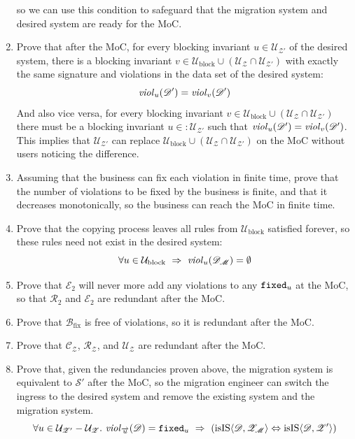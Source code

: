 \documentclass[runningheads]{llncs}
\newcommand{\id}[1]{\text{\it #1\/}}
\newcommand{\viol}[2]{\violC{#1}(#2)}
\newcommand{\violC}[1]{\id{viol}_{#1}}
\newcommand{\pair}[2]{\langle{#1},{#2}\rangle}
\newcommand{\concepts}{\mathcal{C}}
\newcommand{\rels}{\mathcal{R}}   %
\newcommand{\rules}{\mathcal{U}}
\newcommand{\transactions}{\mathcal{E}}
\newcommand{\busConstraints}{\mathcal{B}}
\newcommand{\dataset}{\mathscr{D}}
\newcommand{\schema}{\mathscr{Z}}
\newcommand{\migrsys}{\mathscr{M}}
\newcommand{\infsys}{\mathscr{S}}
\begin{document}
\begin{enumerate}
      so we can use this condition to safeguard that the migration system and desired system are ready for the MoC.
\item Prove that after the MoC, for every blocking invariant $u\in\rules_{\schema'}$ of the desired system,
      there is a blocking invariant $v\in\rules_\text{block}\cup(\rules_{\schema}\cap\rules_{\schema'})$
      with exactly the same signature and violations in the data set of the desired system:
   \begin{equation}
      \viol{u}{\dataset'}=\viol{v}{\dataset'}
   \end{equation}
      And also vice versa, for every blocking invariant $v\in\rules_\text{block}\cup(\rules_{\schema}\cap\rules_{\schema'})$
      there must be a blocking invariant $u\in:\rules_{\schema'}$ such that $\viol{u}{\dataset'}=\viol{v}{\dataset'}$.
      This implies that $\rules_{\schema'}$ can replace $\rules_\text{block}\cup(\rules_{\schema}\cap\rules_{\schema'})$ on the MoC
      without users noticing the difference.
\item Assuming that the business can fix each violation in finite time,
      prove that the number of violations to be fixed by the business is finite,
      and that it decreases monotonically, so the business can reach the MoC in finite time.
\item Prove that the copying process leaves all rules from $\rules_\text{block}$ satisfied forever,
      so these rules need not exist in the desired system:
   \begin{equation}
      \forall u\in\rules_\text{block}\ \Rightarrow\ \viol{u}{\dataset_\migrsys}=\emptyset
   \end{equation}
\item Prove that $\transactions_2$ will never more add any violations to any ${\tt fixed}_u$ at the MoC, so that $\rels_2$ and $\transactions_2$ are redundant after the MoC.
\item Prove that $\busConstraints_\text{fix}$ is free of violations, so it is redundant after the MoC.
\item Prove that $\concepts_{\schema}$, $\rels_{\schema}$, and $\rules_{\schema}$ are redundant after the MoC.
\item Prove that, given the redundancies proven above, the migration system is equivalent to $\infsys'$ after the MoC,
      so the migration engineer can switch the ingress to the desired system and remove the existing system and the migration system.
   \begin{equation}
      \forall u\in\rules_{\schema'}-\rules_{\schema}.~\viol{\overrightarrow{u}}{\dataset}={\tt fixed}_u\ \Rightarrow\ (\text{isIS}\pair{\dataset}{\schema_\migrsys}\Leftrightarrow\text{isIS}\pair{\dataset}{\schema'})
   \end{equation}
\end{enumerate}
\end{document}
